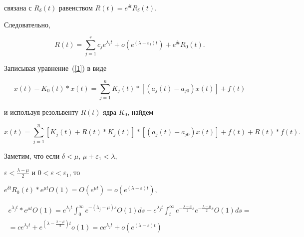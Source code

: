 связана с $R_{\delta}(t)$ равенством $R(t)=e^{\delta t}R_{\delta}(t)$. 


Следовательно,


\begin{equation}


\label{6}


R(t)=\sum\limits_{j=1}^r c_j e^{\lambda_j t}+o (e^{(\lambda-


\varepsilon_1)t}


)+e^{\delta t}R_0(t).


\end{equation}


Записывая уравнение~(\ref{1}) в виде


$$


x(t)-K_0(t)*x(t)=\sum\limits_{j=1}^n K_j(t)* [ (a_j(t)-


a_{j0})x(t) ]+f(t)


$$


и используя резольвенту $R(t)$ ядра $K_0$, найдем


\begin{equation}


\label{7}


x(t)=\sum\limits_{j=1}^n [


K_j(t)+R(t)*K_j(t) ]* [ (a_j(t)-a_{j0})x(t) ]


+f(t)+R(t)*f(t).


\end{equation}





Заметим, что если $\delta<\mu$, $\mu+\varepsilon_1<\lambda$,


$\varepsilon<\frac{\lambda-\mu}2$ и $0<\varepsilon<\varepsilon_1$, то


$e^{\delta t}R_0(t)*e^{\mu t} O(1)=O (e^{\mu t})=o (e^{(\lambda-


\varepsilon) t})$,


\begin{gather*}


e^{\lambda_j t }*e^{\mu t} O (1)=e^{\lambda_j t }


\int_0^\infty e^{- (\lambda_j-\mu)s } O (1)ds-


e^{\lambda_j t } \int_t^\infty e^{-\frac{\lambda-\mu}2 s}


e^{-\frac{\lambda-\mu}2 s} O (1)ds=\\


%


=c e^{\lambda_j t }+e^{ (\lambda-\frac{\lambda-\mu}2) t}


o (1)=c e^{\lambda_j t}+o (e^{(\lambda-\varepsilon) t})


\end{gather*}


